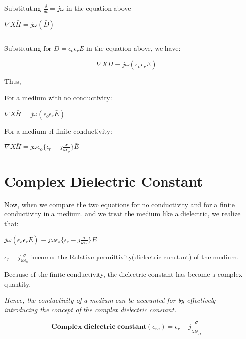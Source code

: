 Substituting $\frac{\delta}{\delta t} = j\omega$ in the equation above

\begin{center}
$\nabla X \bar{H} = j \omega(\bar{D})$
\end{center}
\begin{equation}\end{equation}

Substituting for $\bar{D} = \epsilon_{o}\epsilon_{r}\bar{E}$ in the equation above, we have:

\begin{equation}
\nabla X \bar{H} = j \omega(\epsilon_{o}\epsilon_{r}\bar{E})
\end{equation}



Thus,

For a medium with no conductivity:
\begin{center}
$\nabla X \bar{H} = j \omega(\epsilon_{o}\epsilon_{r}\bar{E})$
\end{center}

For a medium of finite conductivity:
\begin{center}
$\nabla X \bar{H} = j\omega\epsilon_{o}\bigg\{\epsilon_{r} -j \frac{\sigma}{\omega\epsilon_{o}}\bigg\}\bar{E}$ 
\end{center}

\section{Complex Dielectric Constant}
Now, when we compare the two equations for no conductivity and for a finite conductivity in a medium, and we treat the medium like a dielectric, we realize that:

\begin{center}
$j \omega(\epsilon_{o}\epsilon_{r}\bar{E}) \equiv j\omega\epsilon_{o}\bigg\{\epsilon_{r} -j \frac{\sigma}{\omega\epsilon_{o}}\bigg\}\bar{E}$ 
\end{center}

\textbf{$\epsilon_{r} -j \frac{\sigma}{\omega\epsilon_{o}}$} becomes the Relative permittivity(dielectric constant) of the medium.

Because of the finite conductivity, the dielectric constant has become a complex quantity.

\textit{Hence, the conductivity of a medium can be accounted for by effectively introducing the concept of the complex dielectric constant.}

\begin{equation}
\textbf{Complex dielectric constant} (\epsilon_{rc}) = \epsilon_{r} -j \frac{\sigma}{\omega\epsilon_{o}}
\end{equation}

